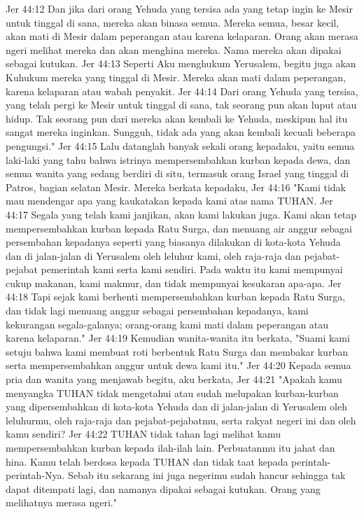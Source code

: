 Jer 44:12  Dan jika dari orang Yehuda yang tersisa ada yang tetap ingin ke Mesir untuk tinggal di sana, mereka akan binasa semua. Mereka semua, besar kecil, akan mati di Mesir dalam peperangan atau karena kelaparan. Orang akan merasa ngeri melihat mereka dan akan menghina mereka. Nama mereka akan dipakai sebagai kutukan.
Jer 44:13  Seperti Aku menghukum Yerusalem, begitu juga akan Kuhukum mereka yang tinggal di Mesir. Mereka akan mati dalam peperangan, karena kelaparan atau wabah penyakit.
Jer 44:14  Dari orang Yehuda yang tersisa, yang telah pergi ke Mesir untuk tinggal di sana, tak seorang pun akan luput atau hidup. Tak seorang pun dari mereka akan kembali ke Yehuda, meskipun hal itu sangat mereka inginkan. Sungguh, tidak ada yang akan kembali kecuali beberapa pengungsi."
Jer 44:15  Lalu datanglah banyak sekali orang kepadaku, yaitu semua laki-laki yang tahu bahwa istrinya mempersembahkan kurban kepada dewa, dan semua wanita yang sedang berdiri di situ, termasuk orang Israel yang tinggal di Patros, bagian selatan Mesir. Mereka berkata kepadaku,
Jer 44:16  "Kami tidak mau mendengar apa yang kaukatakan kepada kami atas nama TUHAN.
Jer 44:17  Segala yang telah kami janjikan, akan kami lakukan juga. Kami akan tetap mempersembahkan kurban kepada Ratu Surga, dan menuang air anggur sebagai persembahan kepadanya seperti yang biasanya dilakukan di kota-kota Yehuda dan di jalan-jalan di Yerusalem oleh leluhur kami, oleh raja-raja dan pejabat-pejabat pemerintah kami serta kami sendiri. Pada waktu itu kami mempunyai cukup makanan, kami makmur, dan tidak mempunyai kesukaran apa-apa.
Jer 44:18  Tapi sejak kami berhenti mempersembahkan kurban kepada Ratu Surga, dan tidak lagi menuang anggur sebagai persembahan kepadanya, kami kekurangan segala-galanya; orang-orang kami mati dalam peperangan atau karena kelaparan."
Jer 44:19  Kemudian wanita-wanita itu berkata, "Suami kami setuju bahwa kami membuat roti berbentuk Ratu Surga dan membakar kurban serta mempersembahkan anggur untuk dewa kami itu."
Jer 44:20  Kepada semua pria dan wanita yang menjawab begitu, aku berkata,
Jer 44:21  "Apakah kamu menyangka TUHAN tidak mengetahui atau sudah melupakan kurban-kurban yang dipersembahkan di kota-kota Yehuda dan di jalan-jalan di Yerusalem oleh leluhurmu, oleh raja-raja dan pejabat-pejabatmu, serta rakyat negeri ini dan oleh kamu sendiri?
Jer 44:22  TUHAN tidak tahan lagi melihat kamu mempersembahkan kurban kepada ilah-ilah lain. Perbuatanmu itu jahat dan hina. Kamu telah berdosa kepada TUHAN dan tidak taat kepada perintah-perintah-Nya. Sebab itu sekarang ini juga negerimu sudah hancur sehingga tak dapat ditempati lagi, dan namanya dipakai sebagai kutukan. Orang yang melihatnya merasa ngeri."
